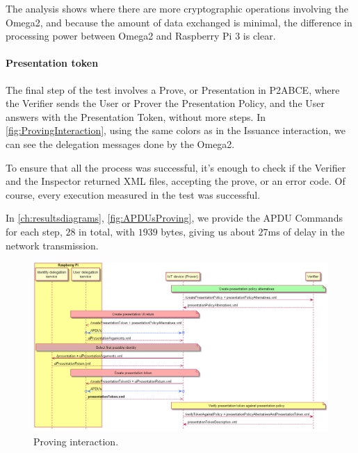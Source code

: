 \documentclass[journal]{IEEEtran}
\begin{document}
The analysis shows where there are more cryptographic operations involving the Omega2, and because the amount of data exchanged is minimal, the difference in processing power between Omega2 and Raspberry Pi 3 is clear.



\paragraph{Presentation token}\hfil

The final step of the test involves a Prove, or Presentation in P2ABCE, where the Verifier sends the User or Prover the Presentation Policy, and the User answers with the Presentation Token, without more steps. In \autoref{fig:ProvingInteraction}, using the same colors as in the Issuance interaction, we can see the delegation messages done by the Omega2.

To ensure that all the process was successful, it's enough to check if the Verifier and the Inspector returned XML files, accepting the prove, or an error code. Of course, every execution measured in the test was successful.

In \autoref{ch:resultsdiagrams}, \autoref{fig:APDUsProving}, we provide the APDU Commands for each step, $28$ in total, with $1939$ bytes, giving us about $27$ms of delay in the network transmission.



\begin{figure}[bth]
	\begin{center}
		\includegraphics[width=\linewidth]{gfx/UML/ProvingInteraction}
	\end{center}
	\caption{Proving interaction.}
	\label{fig:ProvingInteraction}
\end{figure}
\end{document}
